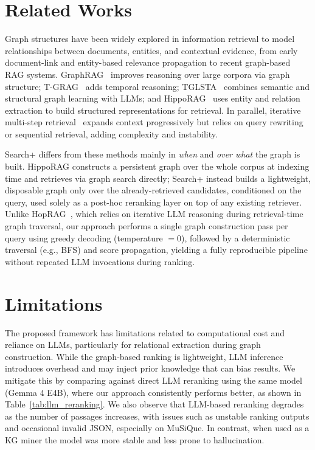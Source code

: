 \documentclass[11pt]{article}
\begin{document}
\section{Related Works}

Graph structures have been widely explored in information retrieval to model relationships between documents, entities, and contextual evidence, from early document-link and entity-based relevance propagation to recent graph-based RAG systems. GraphRAG~\cite{DBLP:conf/naacl/Hu2025} improves reasoning over large corpora via graph structure; T-GRAG~\cite{DBLP:journals/corr/Li2025TGRAG} adds temporal reasoning; TGLSTA~\cite{DBLP:conf/aaai/Zhang2025TGLSTA} combines semantic and structural graph learning with LLMs; and HippoRAG~\cite{DBLP:conf/nips/GutierrezS0Y024} uses entity and relation extraction to build structured representations for retrieval. In parallel, iterative multi-step retrieval~\cite{DBLP:conf/emnlp/SunBC19} expands context progressively but relies on query rewriting or sequential retrieval, adding complexity and instability.

Search+ differs from these methods mainly in \emph{when} and \emph{over what} the graph is built. HippoRAG constructs a persistent graph over the whole corpus at indexing time and retrieves via graph search directly; Search+ instead builds a lightweight, disposable graph only over the already-retrieved candidates, conditioned on the query, used solely as a post-hoc reranking layer on top of any existing retriever. Unlike HopRAG~\cite{DBLP:conf/acl/LiuWCLXYZ25}, which relies on iterative LLM reasoning during retrieval-time graph traversal, our approach performs a single graph construction pass per query using greedy decoding (temperature $=0$), followed by a deterministic traversal (e.g., BFS) and score propagation, yielding a fully reproducible pipeline without repeated LLM invocations during ranking.


\section{Limitations}

The proposed framework has limitations related to computational cost and reliance on LLMs, particularly for relational extraction during graph construction. While the graph-based ranking is lightweight, LLM inference introduces overhead and may inject prior knowledge that can bias results. We mitigate this by comparing against direct LLM reranking using the same model (Gemma 4 E4B), where our approach consistently performs better, as shown in Table~\ref{tab:llm_reranking}. We also observe that LLM-based reranking degrades as the number of passages increases, with issues such as unstable ranking outputs and occasional invalid JSON, especially on MuSiQue. In contrast, when used as a KG miner the model was more stable and less prone to hallucination.
\end{document}
